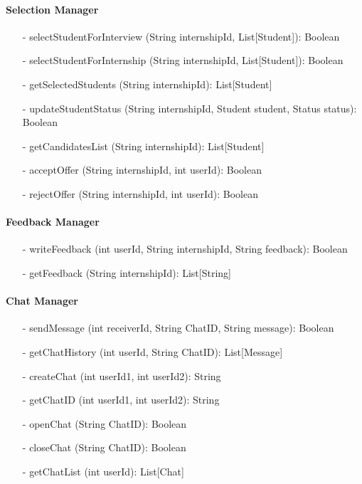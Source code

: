\paragraph{Selection Manager}
\begin{itemize}
    \item[-] selectStudentForInterview (String internshipId, List[Student]): Boolean
    \item[-] selectStudentForInternship (String internshipId, List[Student]): Boolean
    \item[-] getSelectedStudents (String internshipId): List[Student]
    \item[-] updateStudentStatus (String internshipId, Student student, Status status): Boolean
    \item[-] getCandidatesList (String internshipId): List[Student]
    \item[-] acceptOffer (String internshipId, int userId): Boolean
    \item[-] rejectOffer (String internshipId, int userId): Boolean  
\end{itemize}

\paragraph{Feedback Manager}
\begin{itemize}
    \item[-] writeFeedback (int userId, String internshipId, String feedback): Boolean
    \item[-] getFeedback (String internshipId): List[String]
\end{itemize}

\paragraph{Chat Manager}
\begin{itemize}
    \item[-] sendMessage (int receiverId, String ChatID, String message): Boolean
    \item[-] getChatHistory (int userId, String ChatID): List[Message]
    \item[-] createChat (int userId1, int userId2): String
    \item[-] getChatID (int userId1, int userId2): String
    \item[-] openChat (String ChatID): Boolean
    \item[-] closeChat (String ChatID): Boolean
    \item[-] getChatList (int userId): List[Chat]
\end{itemize}


